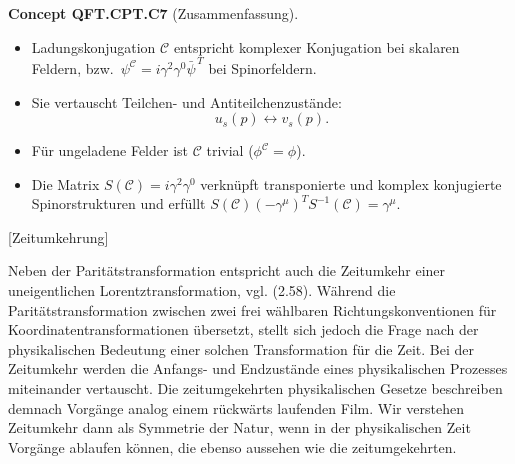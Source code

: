 \documentclass[10pt, letterpaper]{article}
\newcommand{\CustomHeading}[3]{%
  \par\medskip\noindent%
  \textbf{#1 #2} \textnormal{(#3)}.\enskip%
}
\newenvironment{CONC}[2]{\begin{unitbox}\CustomHeading{Concept}{#1}{#2}}{\end{unitbox}}
\begin{document}
\begin{CONC}{QFT.CPT.C7}{Zusammenfassung}
\begin{itemize}
  \item Ladungskonjugation $\mathcal C$ entspricht komplexer Konjugation bei skalaren Feldern, bzw.\ $\psi^{\mathcal C}=i\gamma^2\gamma^0\bar\psi^{\,T}$ bei Spinorfeldern.
  \item Sie vertauscht Teilchen- und Antiteilchenzustände:
  \[
    u_s(p)\leftrightarrow v_s(p).
  \]
  \item Für ungeladene Felder ist $\mathcal C$ trivial ($\phi^{\mathcal C}=\phi$).
  \item Die Matrix $S(\mathcal C)=i\gamma^2\gamma^0$ verknüpft transponierte und komplex konjugierte Spinorstrukturen und erfüllt $S(\mathcal C)(-\gamma^\mu)^T S^{-1}(\mathcal C)=\gamma^\mu$.
\end{itemize}
\end{CONC}


[Zeitumkehrung]

Neben der Paritätstransformation entspricht auch die Zeitumkehr einer uneigentlichen Lorentztransformation, vgl. (2.58). Während die Paritätstransformation zwischen zwei frei wählbaren Richtungskonventionen für Koordinatentransformationen übersetzt, stellt sich jedoch die Frage nach der physikalischen Bedeutung einer solchen Transformation für die Zeit. Bei der Zeitumkehr werden die Anfangs- und Endzustände eines physikalischen Prozesses miteinander vertauscht. Die zeitumgekehrten physikalischen Gesetze beschreiben demnach Vorgänge analog einem rückwärts laufenden Film. Wir verstehen Zeitumkehr dann als Symmetrie der Natur, wenn in der physikalischen Zeit Vorgänge ablaufen können, die ebenso aussehen wie die zeitumgekehrten.
\end{document}
